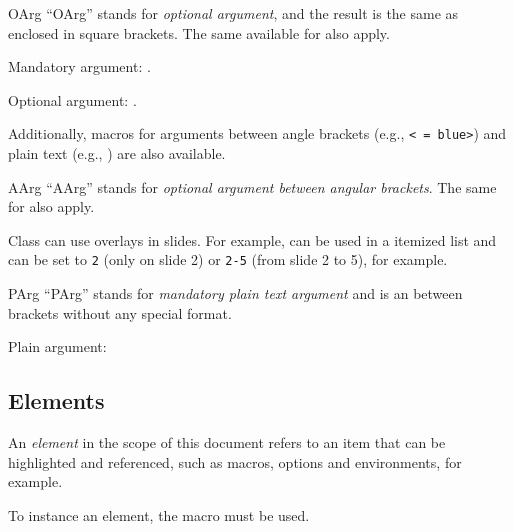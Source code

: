 \documentclass[11pt, outdir = ./out]{article}
\begin{document}
\begin{Macrodef}{OArg}{}{}
    ``OArg'' stands for \textit{optional argument}, and the result is the same as  enclosed in square brackets. The same  available for  also apply.
\end{Macrodef}

\begin{DocsExample}
    Mandatory argument: .\par
    Optional argument: .
\end{DocsExample}

Additionally, macros for arguments between angle brackets (e.g., \texttt{<~=~blue>}) and plain text (e.g., ) are also available.

\begin{Macrodef}{AArg}{}{}
    ``AArg'' stands for \textit{optional argument between angular brackets}. The same  for  also apply.
\end{Macrodef}

\begin{DocsExample}
    Class  can use overlays in slides. For example,  can be used in a itemized list and  can be set to \texttt{2} (only on slide 2) or \texttt{2-5} (from slide 2 to 5), for example.
\end{DocsExample}

\begin{Macrodef}{PArg}{}{}
    ``PArg'' stands for \textit{mandatory plain text argument} and is an  between brackets without any special format.
\end{Macrodef}

\begin{DocsExample}
    Plain argument: 
\end{DocsExample}

\subsection{Elements}

An \textit{element} in the scope of this document refers to an item that can be highlighted and referenced, such as macros, options and environments, for example.

To instance an element, the  macro must be used.
\end{document}
